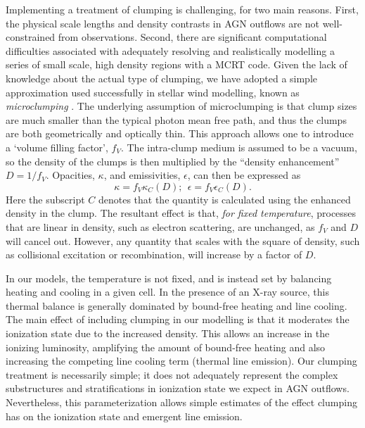 \documentclass[useAMS,usenatbib]{mn2e_x}
\begin{document}
Implementing a treatment of clumping is challenging, for
two main reasons. First, the physical scale lengths and density contrasts 
in AGN outflows are not well-constrained from observations.  
Second, there are significant computational difficulties associated with adequately
resolving and realistically modelling a series of small scale, high density
regions with a MCRT code. 
Given the lack of knowledge about the actual type of clumping, we have adopted
a simple approximation
used successfully in stellar wind modelling, known as 
{\em microclumping} \citep[e.g.][]{hamann1998,hilliermiller1999,hamann2008}. 
The underlying assumption of microclumping is that clump sizes are much smaller than the 
typical photon mean free path, and thus the clumps are 
both geometrically and optically thin. This approach 
allows one to introduce a `volume filling factor', $f_V$. 
The intra-clump medium is assumed to be a vacuum, so the 
density of the clumps is then multiplied by the ``density enhancement'' 
$D=1/f_V$. Opacities, $\kappa$, and emissivities, $\epsilon$, 
can then be expressed as 
\begin{equation}
\kappa = f_V \kappa_C(D);~~\epsilon = f_V \epsilon_C(D).
\end{equation}
Here the subscript $C$ denotes that the quantity is calculated using the 
enhanced density in the clump. The resultant effect is that, {\em for fixed temperature},
 processes that are linear in density, such as electron scattering, are unchanged, 
as $f_V$ and $D$ will cancel out. However, any quantity that scales with the square of density, 
such as collisional excitation or recombination, will increase by a factor of $D$.

In our models, the temperature is not fixed, and is instead set by balancing heating and 
cooling in a given cell. In the presence of an X-ray source, this thermal balance is 
generally dominated by bound-free heating and line cooling. The main effect of including 
clumping in our modelling is that it moderates the ionization state due to the increased 
density. This allows an increase in the ionizing luminosity, amplifying the amount of
bound-free heating and also increasing the competing line cooling term
(thermal line emission).
Our clumping treatment is necessarily simple; it does not adequately
represent the complex substructures and stratifications in ionization
state we expect in AGN outflows. Nevertheless, this parameterization allows simple estimates
of the effect clumping has on the ionization state and emergent 
line emission.
\end{document}
